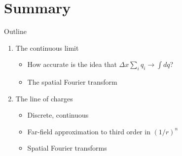 \documentclass{beamer}
\begin{document}
\section{Summary}

\begin{frame}{Outline}
\begin{enumerate}
\item The continuous limit
\begin{itemize}
\item How accurate is the idea that $\Delta x \sum_i q_i \rightarrow \int dq$?
\item The spatial Fourier transform
\end{itemize}
\item The line of charges
\begin{itemize}
\item Discrete, continuous
\item Far-field approximation to third order in $(1/r)^n$
\item Spatial Fourier transforms
\end{itemize}
\end{enumerate}
\end{frame}
\end{document}
